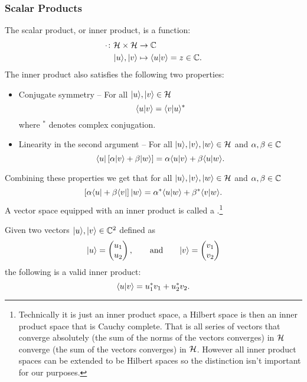     \subsubsection{Scalar Products}
    The scalar product, or inner product, is a function:
    \begin{align*}
        \cdot\colon\mathcal{H}\times\mathcal{H} &\to \mathbb{C}\\
        \vert {u} \rangle, \vert {v} \rangle &\mapsto \langle {u} \vert {v} \rangle = z\in\mathbb{C}.
    \end{align*}
    The inner product also satisfies the following two properties:
    \begin{itemize}
        \item Conjugate symmetry -- For all \(\vert {u} \rangle, \vert {v} \rangle\in\mathcal{H}\)
        \[\langle {u} \vert {v} \rangle = \langle {v} \vert {u} \rangle^*\]
        where \(^*\) denotes complex conjugation.
        \item Linearity in the second argument -- For all \(\vert {u} \rangle, \vert {v} \rangle, \vert {w} \rangle\in\mathcal{H}\) and \(\alpha, \beta\in\mathbb{C}\)
        \[\langle {u} \vert\left[\alpha\vert {v} \rangle + \beta\vert {w} \rangle\right] = \alpha\langle {u} \vert {v} \rangle + \beta\langle {u} \vert {w} \rangle.\]
    \end{itemize}
    Combining these properties we get that for all \(\vert {u} \rangle, \vert {v} \rangle, \vert {w} \rangle\in\mathcal{H}\) and \(\alpha, \beta\in\mathbb{C}\)
    \[\left[\alpha\langle {u} \vert + \beta\langle {v} \vert\right]\vert {w} \rangle = \alpha^*\langle {u} \vert {w} \rangle + \beta^*\langle {v} \vert {w} \rangle.\]
    A vector space equipped with an inner product is called a .\footnote{Technically it is just an inner product space, a Hilbert space is then an inner product space that is Cauchy complete. That is all series of vectors that converge absolutely (the sum of the norms of the vectors converges) in \(\mathcal{H}\) converge (the sum of the vectors converges) in \(\mathcal{H}\). However all inner product spaces can be extended to be Hilbert spaces so the distinction isn't important for our purposes.}
    \begin{example}
        Given two vectors \(\vert {u} \rangle, \vert {v} \rangle\in\mathbb{C}^2\) defined as
        \[
            \vert {u} \rangle =
            \begin{pmatrix}
                u_1\\ u_2
            \end{pmatrix}
            ,\qquad\text{and}\qquad\vert {v} \rangle = 
            \begin{pmatrix}
                v_1\\ v_2
            \end{pmatrix}
        \]
        the following is a valid inner product:
        \[\langle {u} \vert {v} \rangle = u_1^*v_1 + u_2^*v_2.\]
    \end{example}
    

